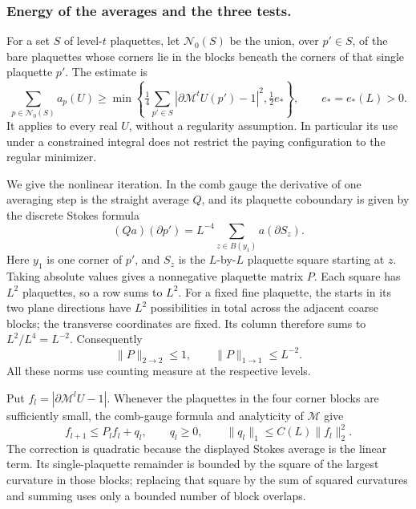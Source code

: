 \documentclass[11pt,letterpaper,reqno]{amsart}
\theoremstyle{definition}
\theoremstyle{remark}
\begin{document}
\subsubsection*{Energy of the averages and the three tests.}

For a set \(S\) of level-\(t\) plaquettes, let \(\mathcal N_0(S)\)
be the union, over \(p'\in S\), of the bare plaquettes whose
corners lie in the blocks beneath the corners of that single
plaquette \(p'\). The estimate is
\begin{equation}\label{eq:energy-of-averages}
 \sum_{p\in\mathcal N_0(S)}a_p(U)
 \ge\min\left\{
   \tfrac14\sum_{p'\in S}|\partial\mathcal M^tU(p')-1|^2,
   \tfrac12e_*\right\},\qquad e_*=e_*(L)>0.
\end{equation}
It applies to every real \(U\), without a regularity assumption.
In particular its use under a constrained integral does not restrict
the paying configuration to the regular minimizer.

We give the nonlinear iteration. In the comb gauge the derivative
of one averaging step is the straight average \(Q\), and its
plaquette coboundary is given by the discrete Stokes formula
\[
 (Qa)(\partial p')
   =L^{-4}\sum_{z\in B(y_1)}a(\partial S_z).
\]
Here \(y_1\) is one corner of \(p'\), and \(S_z\) is the
\(L\)-by-\(L\) plaquette square starting at \(z\).
Taking absolute values gives a nonnegative plaquette matrix \(P\).
Each square has \(L^2\) plaquettes, so a row sums to \(L^2\).
For a fixed fine plaquette, the starts in its two plane directions
have \(L^2\) possibilities in total across the adjacent coarse
blocks; the transverse coordinates are fixed. Its column therefore
sums to \(L^2/L^4=L^{-2}\). Consequently
\[
 \|P\|_{2\to2}\le1,\qquad \|P\|_{1\to1}\le L^{-2}.
\]
All these norms use counting measure at the respective levels.

Put \(f_l=|\partial\mathcal M^lU-1|\). Whenever the plaquettes
in the four corner blocks are sufficiently small, the comb-gauge
formula and analyticity of \(\mathcal M\) give
\[
 f_{l+1}\le P_lf_l+q_l,\qquad q_l\ge0,\qquad
 \|q_l\|_1\le C(L)\|f_l\|_2^2.
\]
The correction is quadratic because the displayed Stokes average
is the linear term. Its single-plaquette remainder is bounded by
the square of the largest curvature in those blocks; replacing
that square by the sum of squared curvatures and summing uses only
a bounded number of block overlaps.
\end{document}
